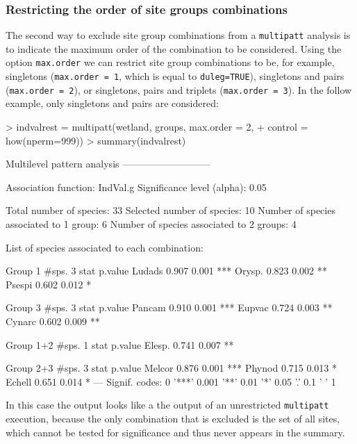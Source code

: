 \documentclass[11pt,a4paper]{article}
\begin{document}
\subsubsection{Restricting the order of site groups combinations}
The second way to exclude site group combinations from a \texttt{multipatt} analysis is to indicate the maximum order of the combination to be considered. Using the option \texttt{max.order} we can restrict site group combinations to be, for example, singletons (\texttt{max.order = 1}, which is equal to \texttt{duleg=TRUE}), singletons and pairs (\texttt{max.order = 2}), or singletons, pairs and triplets (\texttt{max.order = 3}). In the follow example, only singletons and pairs are considered: 
\begin{Schunk}
\begin{Sinput}
> indvalrest = multipatt(wetland, groups, max.order = 2, 
+                        control = how(nperm=999)) 
> summary(indvalrest)
\end{Sinput}
\begin{Soutput}
 Multilevel pattern analysis
 ---------------------------

 Association function: IndVal.g
 Significance level (alpha): 0.05

 Total number of species: 33
 Selected number of species: 10 
 Number of species associated to 1 group: 6 
 Number of species associated to 2 groups: 4 

 List of species associated to each combination: 

 Group 1  #sps.  3 
        stat p.value    
Ludads 0.907   0.001 ***
Orysp. 0.823   0.002 ** 
Psespi 0.602   0.012 *  

 Group 3  #sps.  3 
        stat p.value    
Pancam 0.910   0.001 ***
Eupvac 0.724   0.003 ** 
Cynarc 0.602   0.009 ** 

 Group 1+2  #sps.  1 
        stat p.value   
Elesp. 0.741   0.007 **

 Group 2+3  #sps.  3 
        stat p.value    
Melcor 0.876   0.001 ***
Phynod 0.715   0.013 *  
Echell 0.651   0.014 *  
---
Signif. codes:  0 '***' 0.001 '**' 0.01 '*' 0.05 '.' 0.1 ' ' 1 
\end{Soutput}
\end{Schunk}
In this case the output looks like a the output of an unrestricted \texttt{multipatt} execution, because the only combination that is excluded is the set of all sites, which cannot be tested for significance and thus never appears in the summary. 
\end{document}
